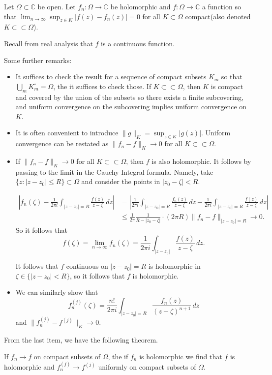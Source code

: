 \documentclass[12pt]{scrartcl}
\newcommand{\C}{\mathbb C}
\begin{document}
\begin{definition} Let $\Omega \subset \C$ be open.  Let $f_n: \Omega \to \C$ be holomorphic and $f: \Omega \to \C$ a function so that $\lim_{n \to \infty} \sup_{z \in K} |f(z) - f_n(z)| = 0$ for all $K \subset \Omega$ compact(also denoted $K \subset \subset \Omega$).  
\end{definition}
\begin{remark} Recall from real analysis that $f$ is a continuous function.  
\end{remark}

Some further remarks:
\begin{itemize}
\item It suffices to check the result for a sequence of compact subsets $K_m$ so that $\bigcup_m K_m^\circ = \Omega$, the it suffices to check those.  If $K \subset \subset \Omega$, then $K$ is compact and covered by the union of the subsets so there exists a finite subcovering, and uniform convergence on the subcovering implies uniform convergence on $K$.
\item It is often convenient to introduce $\|g\|_K = \sup_{z \in K} |g(z)|$.  Uniform convergence can be restated as $\|f_n - f\|_K \to 0$ for all $K \subset \subset \Omega$.
\item If $\|f_n - f\|_K \to 0$ for all $K \subset \subset \Omega$, then $f$ is also holomorphic.  It follows by passing to the limit in the Cauchy Integral formula.  Namely, take $\{z : |z - z_0| \le R\} \subset \Omega$ and consider the points in $|z_0 - \zeta| < R$.  

\begin{align*}
\left |f_n(\zeta) - \frac{1}{2\pi i} \int_{|z - z_0| = R} \frac{f(z)}{z - \zeta}\,dz\right | &= \left |  \frac{1}{2\pi i} \int_{|z - z_0| = R} \frac{f_n(z)}{z - \zeta}\,dz  - \frac{1}{2\pi i} \int_{|z - z_0| = R} \frac{f(z)}{z - \zeta}\,dz\right | \\
&\le \frac{1}{2\pi} \frac{1}{R - |z_0 - \zeta|} \cdot (2\pi R) \|f_n - f\|_{|z - z_0| = R} \to 0.
\end{align*}
So it follows that 
$$f(\zeta) = \lim_{n \to \infty} f_n(\zeta) = \frac{1}{2\pi i} \int_{|z - z_0|} \frac{f(z)}{z - \zeta} \,dz.$$

It follows that $f$ continuous on $|z - z_0| = R$ is holomorphic in $\zeta\in \{|z - z_0| < R\}$, so it follows that $f$ is holomorphic.  
\item We can similarly show that 
$$f_n^(j)(\zeta) = \frac{n!}{2\pi i} \int_{|z - z_0| = R} \frac{f_n(z)}{(z - \zeta)^{n+1}}\,dz$$
and $\|f_n^{(j)} - f^(j)\|_K \to 0$.  
\end{itemize}
From the last item, we have the following theorem.
\begin{thm} If $f_n \to f$ on compact subsets of $\Omega$, the if $f_n$ is holomorphic we find that $f$ is holomorphic and $f_n^(j) \to f^{(j)}$ uniformly on compact subsets of $\Omega$.
\end{thm}
\end{document}
